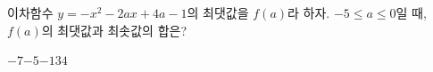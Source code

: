 이차함수 $y=-x^2-2ax+4a-1$의 최댓값을 $f(a)$라 하자. $-5\le a\le 0$일 때, $f(a)$의 최댓값과 최솟값의 합은? 
\begin{choices32}{$-7$}{$-5$}{$-1$}{$3$}{$4$}\end{choices32}
